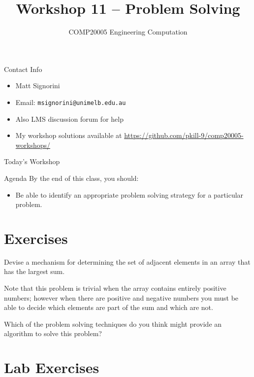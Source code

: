 \documentclass{beamer}
\title{Workshop 11 -- Problem Solving}
\author{COMP20005 Engineering Computation}
\institute{The University of Melbourne}
\begin{document}
\renewcommand{\tt}[1]{\texttt{#1}}

\begin{frame}
    \titlepage
\end{frame}

\begin{frame}{Contact Info}
    \begin{itemize}
        \item Matt Signorini
        \item Email: \tt{msignorini@unimelb.edu.au}
        \item Also LMS discussion forum for help
        \item My workshop solutions available at \url{https://github.com/pkill-9/comp20005-workshops/}
    \end{itemize}
\end{frame}

\begin{frame}{Today's Workshop}
    \begin{block}{Agenda}
        By the end of this class, you should:
        \begin{itemize}
            \item Be able to identify an appropriate problem solving
                strategy for a particular problem.
        \end{itemize}
    \end{block}
\end{frame}

\section{Exercises}

\begin{frame}{9.7}
    Devise a mechanism for determining the set of adjacent elements in an
    array that has the largest sum.

    Note that this problem is trivial when the array contains entirely
    positive numbers; however when there are positive and negative numbers
    you must be able to decide which elements are part of the sum and
    which are not.

    Which of the problem solving techniques do you think might provide an
    algorithm to solve this problem?
\end{frame}


\section{Lab Exercises}
\end{document}

